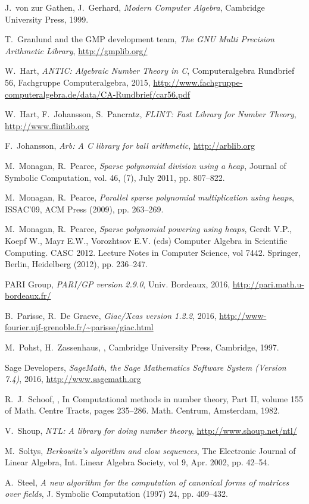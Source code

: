 \documentclass{sig-alternate-05-2015}
\begin{document}
{\begin{thebibliographyy}{99}
J.~von zur Gathen, J.~Gerhard, {\em Modern Computer Algebra}, Cambridge University Press, 1999.

T.~Granlund and the GMP development team, {\em The GNU Multi Precision Arithmetic 
Library}, \url{http://gmplib.org/}

W.~Hart, {\em ANTIC: Algebraic Number Theory in C}, Computeralgebra Rundbrief 56, Fachgruppe Computeralgebra, 2015, \url{http://www.fachgruppe-computeralgebra.de/data/CA-Rundbrief/car56.pdf}

W.~Hart, F.~Johansson, S.~Pancratz, {\em FLINT: Fast Library for Number Theory}, \url{http://www.flintlib.org}

F.~Johansson, {\em Arb: A C library for ball arithmetic}, \url{http://arblib.org}

M.~Monagan, R.~Pearce, {\em Sparse polynomial division using a heap}, Journal of Symbolic Computation, vol. 46, (7), July 2011, pp. 807--822.

M.~Monagan, R.~Pearce, {\em Parallel sparse polynomial multiplication using heaps}, ISSAC'09, ACM Press (2009), pp. 263--269.

M.~Monagan, R.~Pearce, {\em Sparse polynomial powering using heaps}, Gerdt V.P., Koepf W., Mayr E.W., Vorozhtsov E.V. (eds) Computer Algebra in Scientific Computing. CASC 2012. Lecture Notes in Computer Science, vol 7442. Springer, Berlin, Heidelberg (2012), pp. 236--247.

PARI Group, {\em PARI/GP version 2.9.0}, Univ. Bordeaux, 2016, \url{http://pari.math.u-bordeaux.fr/}

B.~Parisse, R.~De Graeve, {\em Giac/Xcas version 1.2.2}, 2016, \url{http://www-fourier.ujf-grenoble.fr/~parisse/giac.html}

M.~Pohst, H.~Zassenhaus,
,
\newblock Cambridge University Press, Cambridge, 1997.

Sage Developers, {\em SageMath, the Sage Mathematics Software System (Version 7.4)}, 2016,  \url{http://www.sagemath.org}

R.~J.~Schoof,
,
\newblock In Computational methods in number theory, {P}art {II}, volume
  155 of Math. Centre Tracts, pages 235--286. Math. Centrum, Amsterdam,
  1982.

V.~Shoup, {\em NTL: A library for doing number theory}, \url{http://www.shoup.net/ntl/}

M.~Soltys, {\em Berkowitz's algorithm and clow sequences}, The Electronic Journal of Linear Algebra, Int. Linear Algebra Society, vol 9, Apr. 2002, pp. 42--54.

A.~Steel, {\em A new algorithm for the computation of canonical forms of matrices over fields}, J. Symbolic
Computation (1997) 24, pp. 409--432.

%
%
\end{thebibliographyy}}
\end{document}
